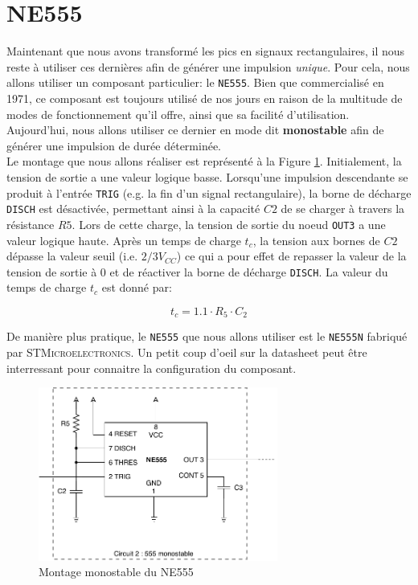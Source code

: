 \section{NE555}

Maintenant que nous avons transformé les pics en signaux rectangulaires, il nous reste à utiliser ces dernières afin de générer une impulsion \textit{unique}. Pour cela, nous allons utiliser un composant particulier: le \texttt{NE555}. Bien que commercialisé en 1971, ce composant est toujours utilisé de nos jours en raison de la multitude de modes de fonctionnement qu'il offre, ainsi que sa facilité d'utilisation. Aujourd'hui, nous allons utiliser ce dernier en mode dit \textbf{monostable} afin de générer une impulsion de durée déterminée. \\

Le montage que nous allons réaliser est représenté à la Figure \ref{fig:mono555}. Initialement, la tension de sortie a une valeur logique basse. Lorsqu'une impulsion descendante se produit à l'entrée \texttt{TRIG} (e.g. la fin d'un signal rectangulaire), la borne de décharge \texttt{DISCH} est désactivée, permettant ainsi à la capacité $C2$ de se charger à travers la résistance $R5$. Lors de cette charge, la tension de sortie du noeud \texttt{OUT3} a une valeur logique haute. Après un temps de charge $t_c$, la tension aux bornes de $C2$ dépasse la valeur seuil (i.e. $2/3V_{CC}$) ce qui a pour effet de repasser la valeur de la tension de sortie à 0 et de réactiver la borne de décharge \texttt{DISCH}. La valeur du temps de charge $t_c$ est donné par:

\begin{equation}
    t_c = 1.1 \cdot R_5 \cdot C_2
\end{equation}

De manière plus pratique, le \texttt{NE555} que nous allons utiliser est le \texttt{NE555N} fabriqué par \textsc{STMicroelectronics}. Un petit coup d'oeil sur la datasheet peut être interressant pour connaitre la configuration du composant. 

\begin{figure}[h!]
    \centering
    \includegraphics[width=0.7\textwidth]{HO2_555.pdf}
    \caption{Montage monostable du NE555}
    \label{fig:mono555}
\end{figure}